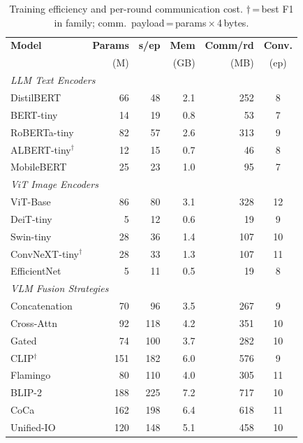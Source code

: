 \documentclass[conference]{IEEEtran}
\begin{document}
\begin{table}[!h]
\caption{Training efficiency and per-round communication cost.
$\dagger$\,=\,best F1 in family; comm.\ payload\,=\,params\,$\times$\,4\,bytes.}
\label{tab:efficiency}
\centering\footnotesize
\setlength{\tabcolsep}{3.5pt}
\begin{tabular}{lrrrrc}
\toprule
\textbf{Model} & \textbf{Params} & \textbf{s/ep} &
\textbf{Mem} & \textbf{Comm/rd} & \textbf{Conv.}\\
 & (M) & & (GB) & (MB) & (ep)\\
\midrule
\multicolumn{6}{l}{\textit{LLM Text Encoders}}\\
DistilBERT      & 66  & 48  & 2.1 & 252 & 8  \\
BERT-tiny       & 14  & 19  & 0.8 &  53 & 7  \\
RoBERTa-tiny    & 82  & 57  & 2.6 & 313 & 9  \\
ALBERT-tiny$^\dagger$ & 12 & 15 & 0.7 & 46 & 8 \\
MobileBERT      & 25  & 23  & 1.0 &  95 & 7  \\
\midrule
\multicolumn{6}{l}{\textit{ViT Image Encoders}}\\
ViT-Base        & 86  & 80  & 3.1 & 328 & 12 \\
DeiT-tiny       & 5   & 12  & 0.6 &  19 & 9  \\
Swin-tiny       & 28  & 36  & 1.4 & 107 & 10 \\
ConvNeXT-tiny$^\dagger$ & 28 & 33 & 1.3 & 107 & 11 \\
EfficientNet    & 5   & 11  & 0.5 &  19 & 8  \\
\midrule
\multicolumn{6}{l}{\textit{VLM Fusion Strategies}}\\
Concatenation   & 70  &  96 & 3.5 & 267 & 9  \\
Cross-Attn      & 92  & 118 & 4.2 & 351 & 10 \\
Gated           & 74  & 100 & 3.7 & 282 & 10 \\
CLIP$^\dagger$  & 151 & 182 & 6.0 & 576 & 9  \\
Flamingo        & 80  & 110 & 4.0 & 305 & 11 \\
BLIP-2          & 188 & 225 & 7.2 & 717 & 10 \\
CoCa            & 162 & 198 & 6.4 & 618 & 11 \\
Unified-IO      & 120 & 148 & 5.1 & 458 & 10 \\
\bottomrule
\end{tabular}
\end{table}
\end{document}
